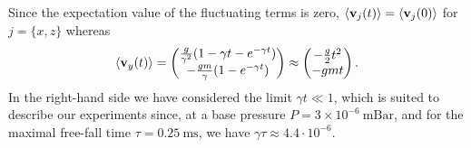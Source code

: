 \documentclass[aps,amssymb,amsmath,prb,superscriptaddress,reprint,notitlepage,onecolumn]{revtex4-1}
\newcommand{\<}{\langle}
\renewcommand{\>}{\rangle}
\begin{document}
%
Since the expectation value of the fluctuating terms is zero, $\langle\vb{v}_j(t)\rangle=\langle \vb{v}_j(0)\rangle$ for $j=\lbrace x,z\rbrace$ whereas 
%
\begin{equation}\label{eq: stateVector_FF}
	\langle\vb{v}_y(t)\rangle=\begin{pmatrix}
		\frac{g}{\gamma^2}(1-\gamma t-e^{-\gamma t})\\
		-\frac{g m}{\gamma}(1-e^{-\gamma t})
	\end{pmatrix}\approx\begin{pmatrix}
		-\frac{g}{2}t^2\\
		-g m t
	\end{pmatrix}.
\end{equation}
%
In the right-hand side we have considered the limit $\gamma t\ll 1$, which is suited to describe our experiments since, at a base pressure $P=3\times 10^{-6}~\mathrm{mBar}$, and for the maximal free-fall time $\tau=0.25~\mathrm{ms}$, we have $\gamma \tau \approx 4.4\cdot 10^{-6}$. 
\end{document}
